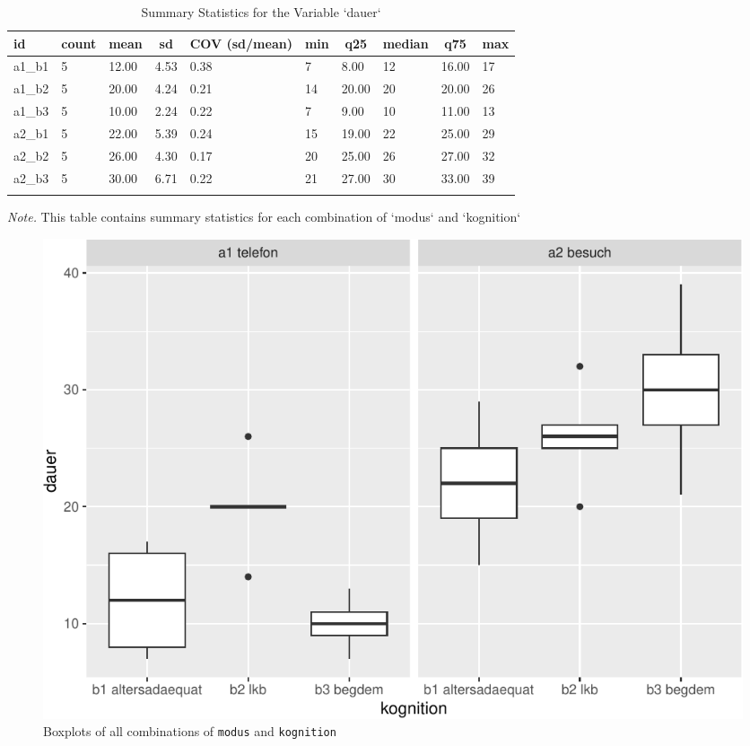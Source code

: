 \documentclass[
  doc,floatsintext]{apa6}
\begin{document}
\begin{table}[tbp]

\begin{center}
\begin{threeparttable}

\caption{\label{tab:tabsummary}Summary Statistics for the Variable `dauer`}

\begin{tabular}{llllllllll}
\toprule
id & \multicolumn{1}{c}{count} & \multicolumn{1}{c}{mean} & \multicolumn{1}{c}{sd} & \multicolumn{1}{c}{COV (sd/mean)} & \multicolumn{1}{c}{min} & \multicolumn{1}{c}{q25} & \multicolumn{1}{c}{median} & \multicolumn{1}{c}{q75} & \multicolumn{1}{c}{max}\\
\midrule
a1\_b1 & 5 & 12.00 & 4.53 & 0.38 & 7 & 8.00 & 12 & 16.00 & 17\\
a1\_b2 & 5 & 20.00 & 4.24 & 0.21 & 14 & 20.00 & 20 & 20.00 & 26\\
a1\_b3 & 5 & 10.00 & 2.24 & 0.22 & 7 & 9.00 & 10 & 11.00 & 13\\
a2\_b1 & 5 & 22.00 & 5.39 & 0.24 & 15 & 19.00 & 22 & 25.00 & 29\\
a2\_b2 & 5 & 26.00 & 4.30 & 0.17 & 20 & 25.00 & 26 & 27.00 & 32\\
a2\_b3 & 5 & 30.00 & 6.71 & 0.22 & 21 & 27.00 & 30 & 33.00 & 39\\
\bottomrule
\addlinespace
\end{tabular}

\begin{tablenotes}[para]
\normalsize{\textit{Note.} This table contains summary statistics for each combination of `modus` and `kognition`}
\end{tablenotes}

\end{threeparttable}
\end{center}

\end{table}

\begin{figure}
\centering
\includegraphics{desc_aov_files/figure-latex/aboxplot-1.pdf}
\caption{\label{fig:aboxplot}Boxplots of all combinations of \texttt{modus} and \texttt{kognition}}
\end{figure}
\end{document}
